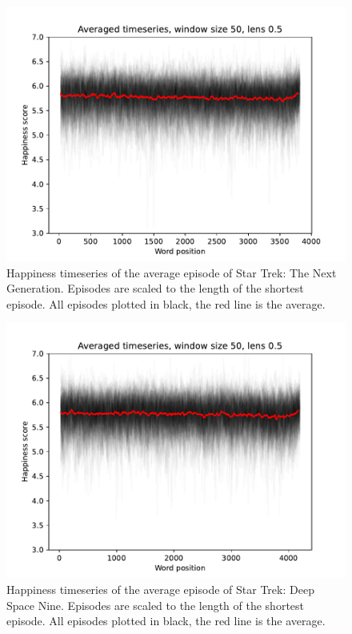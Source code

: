 \begin{figure}
    \centering
    \includegraphics[width=\columnwidth]{figures/localized/average_episode_tng.pdf}
    \caption{Happiness timeseries of the average episode of Star Trek: The Next Generation. Episodes are scaled to the length of the shortest episode. All episodes plotted in black, the red line is the average.}
    \label{fig:average_episode_tng}
\end{figure}

\begin{figure}
    \centering
    \includegraphics[width=\columnwidth]{figures/localized/average_episode_ds9.pdf}
    \caption{Happiness timeseries of the average episode of Star Trek: Deep Space Nine. Episodes are scaled to the length of the shortest episode. All episodes plotted in black, the red line is the average.}
    \label{fig:average_episode_ds9}
\end{figure}


